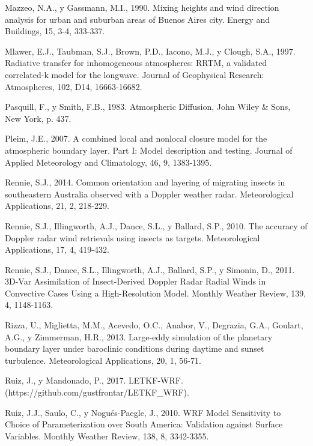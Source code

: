 \documentclass[12pt,spanish,oneside]{book}
\begin{document}
\hypertarget{ref-Mazzeo1990}{}
Mazzeo, N.A., y Gassmann, M.I., 1990. Mixing heights and wind direction
analysis for urban and suburban areas of Buenos Aires city. Energy and
Buildings, 15, 3-4, 333-337.

\hypertarget{ref-Mlawer1997}{}
Mlawer, E.J., Taubman, S.J., Brown, P.D., Iacono, M.J., y Clough, S.A.,
1997. Radiative transfer for inhomogeneous atmospheres: RRTM, a
validated correlated-k model for the longwave. Journal of Geophysical
Research: Atmospheres, 102, D14, 16663-16682.

\hypertarget{ref-Pasquill1983}{}
Pasquill, F., y Smith, F.B., 1983. Atmospheric Diffusion, John Wiley \&
Sons, New York, p. 437.

\hypertarget{ref-Pleim2007}{}
Pleim, J.E., 2007. A combined local and nonlocal closure model for the
atmospheric boundary layer. Part I: Model description and testing.
Journal of Applied Meteorology and Climatology, 46, 9, 1383-1395.

\hypertarget{ref-Rennie2014}{}
Rennie, S.J., 2014. Common orientation and layering of migrating insects
in southeastern Australia observed with a Doppler weather radar.
Meteorological Applications, 21, 2, 218-229.

\hypertarget{ref-Rennie2010}{}
Rennie, S.J., Illingworth, A.J., Dance, S.L., y Ballard, S.P., 2010. The
accuracy of Doppler radar wind retrievals using insects as targets.
Meteorological Applications, 17, 4, 419-432.

\hypertarget{ref-Rennie2011}{}
Rennie, S.J., Dance, S.L., Illingworth, A.J., Ballard, S.P., y Simonin,
D., 2011. 3D-Var Assimilation of Insect-Derived Doppler Radar Radial
Winds in Convective Cases Using a High-Resolution Model. Monthly Weather
Review, 139, 4, 1148-1163.

\hypertarget{ref-Rizza2013}{}
Rizza, U., Miglietta, M.M., Acevedo, O.C., Anabor, V., Degrazia, G.A.,
Goulart, A.G., y Zimmerman, H.R., 2013. Large-eddy simulation of the
planetary boundary layer under baroclinic conditions during daytime and
sunset turbulence. Meteorological Applications, 20, 1, 56-71.

\hypertarget{ref-Ruiz2017}{}
Ruiz, J., y Mandonado, P., 2017. LETKF-WRF.
(https://github.com/gustfrontar/LETKF\_WRF).

\hypertarget{ref-Ruiz2010}{}
Ruiz, J.J., Saulo, C., y Nogués-Paegle, J., 2010. WRF Model Sensitivity
to Choice of Parameterization over South America: Validation against
Surface Variables. Monthly Weather Review, 138, 8, 3342-3355.
\end{document}
